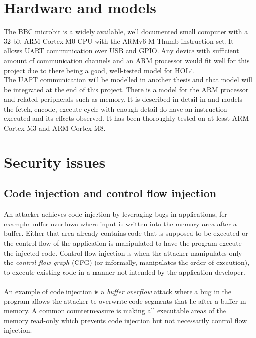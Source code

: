 \documentclass[fleqn]{kththesis}
\begin{document}
\section{Hardware and models}
The BBC microbit \parencite{microbit} is a widely available, well documented small computer with a 32-bit ARM Cortex M0 CPU with the ARMv6-M Thumb instruction set. It allows UART communication over USB and GPIO. Any device with sufficient amount of communication channels and an ARM processor would fit well for this project due to there being a good, well-tested model for HOL4. 
\\
The UART communication will be modelled in another thesis and that model will be integrated at the end of this project. There is a model for the ARM processor and related peripherals such as memory. It is described in detail in \parencite{trustworthy_monad} and models the fetch, encode, execute cycle with enough detail do have an instruction executed and its effects observed. It has been thoroughly tested on at least ARM Cortex M3 and ARM Cortex M8.


\section{Security issues}

\subsection{Code injection and control flow injection}
An attacker achieves code injection by leveraging bugs in applications, for example buffer overflows where input is written into the memory area after a buffer. Either that area already contains code that is supposed to be executed or the control flow of the application is manipulated to have the program execute the injected code. Control flow injection is when the attacker manipulates only the \emph{control flow graph} (CFG) (or informally, manipulates the order of execution), to execute existing code in a manner not intended by the application developer. 
\paragraph{}
An example of code injection is a \emph{buffer overflow} attack where a bug in the program allows the attacker to overwrite code segments that lie after a buffer in memory. A common countermeasure is making all executable areas of the memory read-only which prevents code injection but not necessarily control flow injection.
\end{document}

